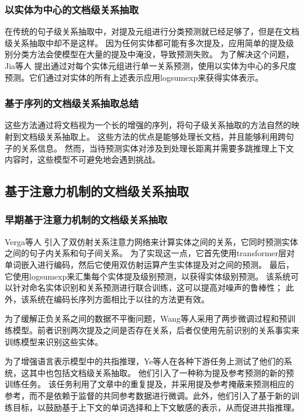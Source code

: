 \documentclass[bachelor]{thesis-uestc}
\begin{document}
\subsubsection{以实体为中心的文档级关系抽取}
在传统的句子级关系抽取中，对提及元组进行分类预测就已经足够了，但是在文档级关系抽取中却不是这样。
因为任何实体都可能有多次提及，应用简单的提及级别分类方法会使模型在大量的提及中淹没，导致预测失败。
为了解决这个问题，Jia等人 提出通过对每个实体元组进行单一关系预测，使用以实体为中心的多尺度预测。它们通过对实体的所有上述表示应用logsumexp来获得实体表示。

\subsubsection{基于序列的文档级关系抽取总结}
这些方法通过将文档视为一个长的增强的序列，将句子级关系抽取的方法自然的映射到文档级关系抽取上。
这些方法的优点是能够处理长文档，并且能够利用跨句子的关系信息。
然而，当待预测实体对涉及到处理长距离并需要多跳推理上下文内容时，这些模型不可避免地会遇到挑战。

\subsection{基于注意力机制的文档级关系抽取}

\subsubsection{早期基于注意力机制的文档级关系抽取}
Verga等人 引入了双仿射关系注意力网络来计算实体之间的关系，它同时预测实体之间的句子内关系和句子间关系。
为了实现这一点，它首先使用transformer层对单词嵌入进行编码，然后它使用双仿射运算产生实体提及对之间的预测。
最后，它使用logsumexp来汇集每个实体提及级别预测，以获得实体级别预测。
该系统可以针对命名实体识别和关系预测进行联合训练，这可以提高对噪声的鲁棒性； 此外，该系统在编码长序列方面相比于以往的方法更有效。\par

为了缓解正负关系之间的数据不平衡问题，Wang等人采用了两步微调过程和预训练模型。前者识别两次提及之间是否存在关系，后者仅使用先前识别的关系事实来训练模型来识别这些实体。\par
为了增强语言表示模型中的共指推理，Ye等人在各种下游任务上测试了他们的系统，这其中也包括文档级关系抽取。
他们引入了一种称为提及参考预测的新的预训练任务。
该任务利用了文章中的重复提及，并采用提及参考掩蔽来预测相应的参考，而不是依赖于监督的共同参考数据进行微调。此外，他们引入了基于新的训练目标，以鼓励基于上下文的单词选择和上下文敏感的表示，从而促进共指推理。
\end{document}
